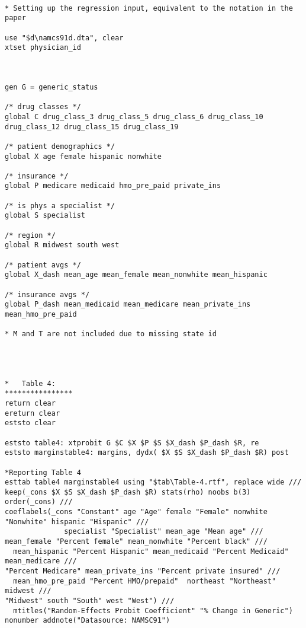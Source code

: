 \documentclass[
]{book}
\begin{document}
\begin{verbatim}

* Setting up the regression input, equivalent to the notation in the paper

use "$d\namcs91d.dta", clear
xtset physician_id



gen G = generic_status

/* drug classes */
global C drug_class_3 drug_class_5 drug_class_6 drug_class_10 drug_class_12 drug_class_15 drug_class_19     

/* patient demographics */
global X age female hispanic nonwhite                                       

/* insurance */
global P medicare medicaid hmo_pre_paid private_ins                             

/* is phys a specialist */
global S specialist                                             

/* region */
global R midwest south west                                         

/* patient avgs */
global X_dash mean_age mean_female mean_nonwhite mean_hispanic                          

/* insurance avgs */
global P_dash mean_medicaid mean_medicare mean_private_ins mean_hmo_pre_paid                    

* M and T are not included due to missing state id




*   Table 4:
****************
return clear
ereturn clear
eststo clear

eststo table4: xtprobit G $C $X $P $S $X_dash $P_dash $R, re
eststo marginstable4: margins, dydx( $X $S $X_dash $P_dash $R) post

*Reporting Table 4
esttab table4 marginstable4 using "$tab\Table-4.rtf", replace wide ///
keep(_cons $X $S $X_dash $P_dash $R) stats(rho) noobs b(3) order(_cons) ///
coeflabels(_cons "Constant" age "Age" female "Female" nonwhite "Nonwhite" hispanic "Hispanic" ///
              specialist "Specialist" mean_age "Mean age" /// 
mean_female "Percent female" mean_nonwhite "Percent black" ///
  mean_hispanic "Percent Hispanic" mean_medicaid "Percent Medicaid" mean_medicare ///
"Percent Medicare" mean_private_ins "Percent private insured" ///
  mean_hmo_pre_paid "Percent HMO/prepaid"  northeast "Northeast" midwest ///
"Midwest" south "South" west "West") ///
  mtitles("Random-Effects Probit Coefficient" "% Change in Generic") nonumber addnote("Datasource: NAMSC91") 





\end{verbatim}
\end{document}
